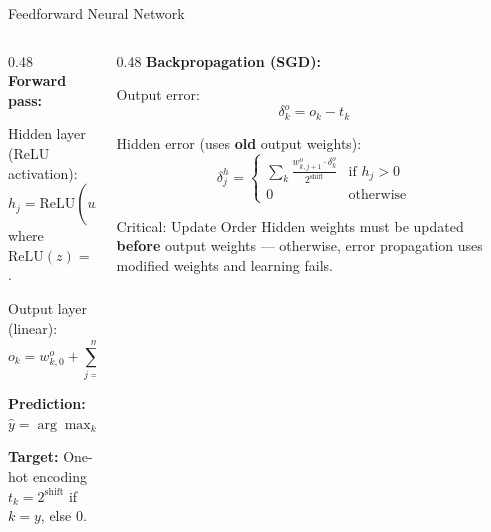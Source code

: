 \documentclass[aspectratio=169, 10pt]{beamer}
\begin{document}
\begin{frame}{Feedforward Neural Network}
\begin{columns}[T]
\begin{column}{0.48\textwidth}
\textbf{Forward pass:}

\vspace{0.3em}
Hidden layer (ReLU activation):
\[
  h_j = \text{ReLU}\!\left(w^h_{j,0} + \sum_{i=1}^{n} w^h_{j,i} \cdot x_i\right)
\]
where $\text{ReLU}(z) = \max(0, z)$.

\vspace{0.3em}
Output layer (linear):
\[
  o_k = w^o_{k,0} + \sum_{j=1}^{m} \frac{w^o_{k,j} \cdot h_j}{2^{\text{shift}}}
\]

\vspace{0.3em}
\textbf{Prediction:} $\hat{y} = \arg\max_k\; o_k$

\vspace{0.5em}
\textbf{Target:} One-hot encoding\\
$t_k = 2^{\text{shift}}$ if $k = y$, else $0$.
\end{column}

\begin{column}{0.48\textwidth}
\textbf{Backpropagation (SGD):}

\vspace{0.3em}
Output error:
\[
  \delta^o_k = o_k - t_k
\]

Hidden error (uses \textbf{old} output weights):
\[
  \delta^h_j = \begin{cases}
    \sum_k \frac{w^o_{k,j+1} \cdot \delta^o_k}{2^{\text{shift}}} & \text{if } h_j > 0\\
    0 & \text{otherwise}
  \end{cases}
\]

\vspace{0.3em}
\begin{alertblock}{Critical: Update Order}
Hidden weights must be updated \textbf{before}
output weights --- otherwise, error propagation
uses modified weights and learning fails.
\end{alertblock}
\end{column}
\end{columns}
\end{frame}
\end{document}
